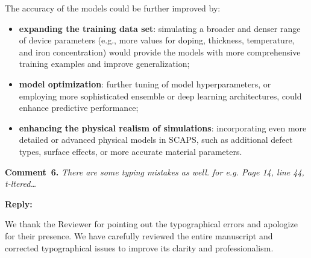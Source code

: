 \documentclass[a4paper,fleqn]{cas-sc}
\begin{document}
\textcolor[rgb]{1.00,0.07,0.00}{
\hl{}}

The accuracy of the models could be further improved by:
\begin{itemize}
    \item \textbf{expanding the training data set}: simulating a broader and denser range of device parameters
    (e.g., more values for doping, thickness, temperature, and iron concentration) would provide
    the models with more comprehensive training examples and improve generalization;
    \item \textbf{model optimization}: further tuning of model hyperparameters, or employing more sophisticated ensemble or deep learning architectures,
    could enhance predictive performance;
    \item \textbf{enhancing the physical realism of simulations}: incorporating even more detailed or advanced physical models in SCAPS,
    such as additional defect types, surface effects, or more accurate material parameters.
\end{itemize}


%
%
%
%
%


\vspace{1cm}
\noindent
\textcolor[rgb]{0.00,0.50,1.00}{\textbf{Comment~6.}}
\emph{There are some typing mistakes as well. for e.g. Page 14, line 44, t-ltered…}

\noindent
\textcolor[rgb]{0.51,0.00,0.00}{\textbf{Reply:}}

We thank the Reviewer for pointing out the typographical errors and apologize for their presence.
We have carefully reviewed the entire manuscript and corrected typographical issues to improve its clarity and  professionalism.
\end{document}
